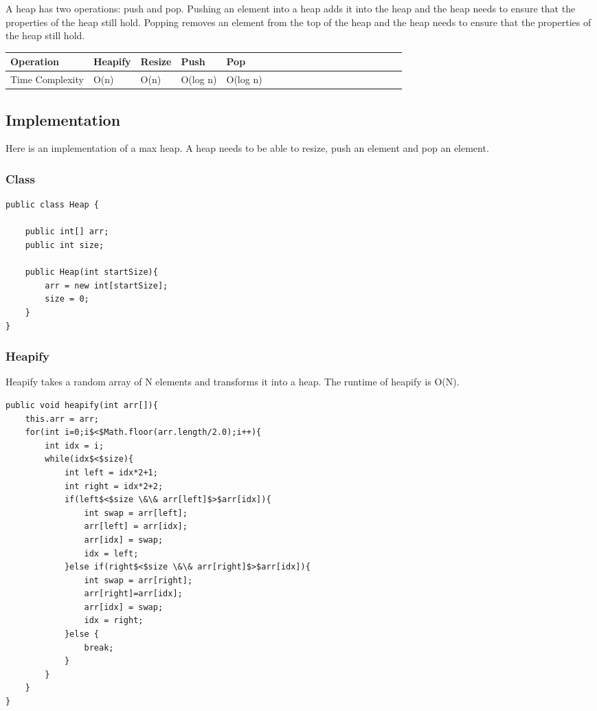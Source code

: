 \documentclass[11pt,oneside]{book}
\begin{document}
A heap has two operations: push and pop. Pushing an element into a heap adds it into the heap and the heap needs to ensure that the properties of the heap still hold. Popping removes an element from the top of the heap and the heap needs to ensure that the properties of the heap still hold.

\vspace{10pt} \begin{tabulary}{0.4\linewidth}{|l|l|l|l|l|l|l|l|l|l|l|l|l|l|l|l|l|l|l}\hline


  Operation &
  Heapify &
  Resize &
  Push &
  Pop\\
\hline


  Time Complexity &
  O(n) &
  O(n) &
  O(log n) &
  O(log n)\\

\hline\end{tabulary}

\subsection{Implementation}

Here is an implementation of a max heap. A heap needs to be able to resize, push an element and pop an element.

\subsubsection{Class}

\begin{lstlisting}
public class Heap {

    public int[] arr;
    public int size;
    
    public Heap(int startSize){
        arr = new int[startSize];
        size = 0;
    }
}
\end{lstlisting}

\subsubsection{Heapify}

Heapify takes a random array of N elements and transforms it into a heap. The runtime of heapify is O(N).

\begin{lstlisting}
public void heapify(int arr[]){
    this.arr = arr;
    for(int i=0;i$<$Math.floor(arr.length/2.0);i++){
        int idx = i;
        while(idx$<$size){
            int left = idx*2+1;
            int right = idx*2+2;
            if(left$<$size \&\& arr[left]$>$arr[idx]){
                int swap = arr[left];
                arr[left] = arr[idx];
                arr[idx] = swap;
                idx = left;
            }else if(right$<$size \&\& arr[right]$>$arr[idx]){
                int swap = arr[right];
                arr[right]=arr[idx];
                arr[idx] = swap;
                idx = right;
            }else {
                break;
            }
        }
    }
}
\end{lstlisting}
\end{document}
